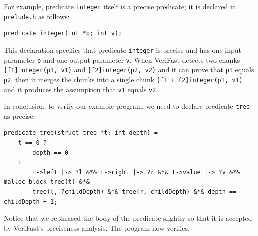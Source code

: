 \documentclass{article}
\begin{document}
For example, predicate \lstinline|integer| itself is a precise
predicate; it is declared in \lstinline|prelude.h| as follows:
\begin{lstlisting}
predicate integer(int *p; int v);
\end{lstlisting}
This declaration specifies that predicate \lstinline|integer|
is precise and has one input parameter \lstinline|p| and one
output parameter \lstinline|v|. When VeriFast detects two
chunks \lstinline|[f1]integer(p1, v1)| and
\lstinline|[f2]integer(p2, v2)| and it can prove that
\lstinline|p1| equals \lstinline|p2|, then it merges the chunks
into a single chunk \lstinline|[f1 + f2]integer(p1, v1)| and it
produces the assumption that \lstinline|v1| equals
\lstinline|v2|.

In conclusion, to verify our example program, we need to
declare predicate \lstinline|tree| as precise:
\begin{lstlisting}
predicate tree(struct tree *t; int depth) =
    t == 0 ?
        depth == 0
    :
        t->left |-> ?l &*& t->right |-> ?r &*& t->value |-> ?v &*& malloc_block_tree(t) &*&
        tree(l, ?childDepth) &*& tree(r, childDepth) &*& depth == childDepth + 1;
\end{lstlisting}
Notice that we rephrased the body of the predicate slightly so
that it is accepted by VeriFast's preciseness analysis. The
program now verifies.
\end{document}
